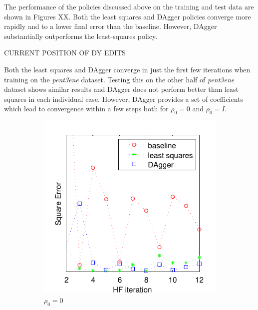 \documentclass[twoside,11pt]{article}
\begin{document}
The performance of the policies discussed above on the training and test data are shown in Figures XX. Both the least squares and DAgger policies converge more rapidly and to a lower final error than the baseline. However, DAgger substantially outperforms the least-squares policy. 

CURRENT POSITION OF DY EDITS

Both the least squares and DAgger converge in just the first few iterations when training on the \textit{pent3ene} dataset. Testing this on the other half of \textit{pent3ene} dataset shows similar results and DAgger does not perform better than least squares in each individual case. However, DAgger provides a set of coefficients which lead to convergence within a few steps both for $\rho_0 = 0$ and $\rho_0 = I$.

\begin{figure}[h!]
\centering
\begin{subfigure}{.5\textwidth}
  \centering
  \includegraphics[scale=0.7]{propylsub_pzero_test_12iter.pdf}
  \caption{$\rho_0 = 0$}
  \label{fig:propSub0}
\end{subfigure}%
\begin{subfigure}{.5\textwidth}
  \centering

\end{subfigure}
\end{figure}
\end{document}
